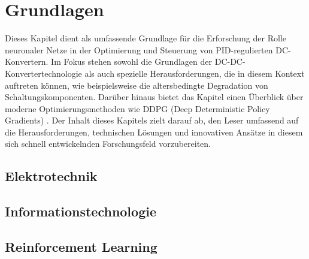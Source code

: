 \chapter{Grundlagen}

Dieses Kapitel dient als umfassende Grundlage für die Erforschung der Rolle neuronaler Netze in der Optimierung und Steuerung von PID-regulierten DC-Konvertern. Im Fokus stehen sowohl die Grundlagen der DC-DC-Konvertertechnologie als auch spezielle Herausforderungen, die in diesem Kontext auftreten können, wie beispielsweise die altersbedingte Degradation von Schaltungskomponenten. Darüber hinaus bietet das Kapitel einen Überblick über moderne Optimierungsmethoden wie DDPG (Deep Deterministic Policy Gradients) . Der Inhalt dieses Kapitels zielt darauf ab, den Leser umfassend auf die Herausforderungen, technischen Lösungen und innovativen Ansätze in diesem sich schnell entwickelnden Forschungsfeld vorzubereiten.



\section{Elektrotechnik}





\section{Informationstechnologie}









\section{Reinforcement Learning}









  






